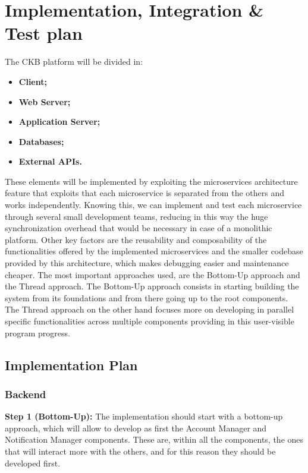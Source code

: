 \documentclass{article}
\begin{document}
{\section{Implementation, Integration \& Test plan}
    The CKB platform will be divided in:
    \begin{itemize}
        \item \textbf{Client;}
        \item \textbf{Web Server;}
        \item \textbf{Application Server;}
        \item \textbf{Databases;}
        \item \textbf{External APIs.}
    \end{itemize}
    These elements will be implemented by exploiting the microservices architecture feature that 
    exploits that each microservice is separated from the others and works independently.
    Knowing this, we can implement and test each microservice through several small 
    development teams, reducing in this way the huge synchronization overhead that would be
    necessary in case of a monolithic platform. 
    Other key factors are the reusability and composability of the functionalities offered by the
    implemented microservices and the smaller codebase provided by this architecture, which makes
    debugging easier and maintenance cheaper.
    The most important approaches used, are the Bottom-Up approach and the Thread approach.
    The Bottom-Up approach consists in starting building the system from its foundations and
    from there going up to the root components.
    The Thread approach on the other hand focuses more on developing in parallel specific 
    functionalities across multiple components providing in this user-visible program progress.

    \subsection{Implementation Plan}
        \subsubsection{Backend}
        \textbf{Step 1 (Bottom-Up):} The implementation should start with a bottom-up approach, which
        will allow to develop as first the Account Manager and Notification Manager components.
        These are, within all the components, the ones that will interact more with the others, and
        for this reason they should be developed first.
        
}
\end{document}
